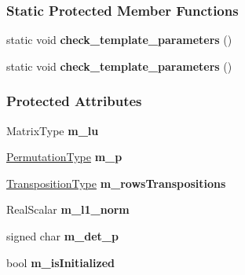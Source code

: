 \subsubsection*{Static Protected Member Functions}
\begin{DoxyCompactItemize}
\item 
\mbox{\label{group___l_u___module_a561b9022ead4336fdacb687f6be86a53}} 
static void {\bfseries check\+\_\+template\+\_\+parameters} ()
\item 
\mbox{\label{group___l_u___module_a561b9022ead4336fdacb687f6be86a53}} 
static void {\bfseries check\+\_\+template\+\_\+parameters} ()
\end{DoxyCompactItemize}
\subsubsection*{Protected Attributes}
\begin{DoxyCompactItemize}
\item 
\mbox{\label{group___l_u___module_a447c0c44420cb6677fbb92d55fbab417}} 
Matrix\+Type {\bfseries m\+\_\+lu}
\item 
\mbox{\label{group___l_u___module_aedc36fc61bd34887a3c2fe5800167f2d}} 
\hyperlink{group___core___module}{Permutation\+Type} {\bfseries m\+\_\+p}
\item 
\mbox{\label{group___l_u___module_aa71083e9e1ef21838a3058ec0ffd0510}} 
\hyperlink{group___core___module}{Transposition\+Type} {\bfseries m\+\_\+rows\+Transpositions}
\item 
\mbox{\label{group___l_u___module_a262635d8536e2e790460e3300f4a9e3c}} 
Real\+Scalar {\bfseries m\+\_\+l1\+\_\+norm}
\item 
\mbox{\label{group___l_u___module_a5771dfc25659778e8ccc609440062f5c}} 
signed char {\bfseries m\+\_\+det\+\_\+p}
\item 
\mbox{\label{group___l_u___module_a99833b9547e2b03a5b78244241dc9188}} 
bool {\bfseries m\+\_\+is\+Initialized}
\end{DoxyCompactItemize}


